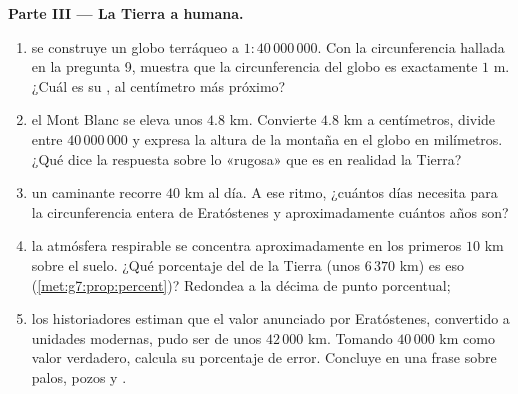 \begin{problem}
\medskip
\noindent\textbf{Parte III --- La Tierra a  humana.}
\begin{enumerate}[resume]
  \item se construye un globo terráqueo a  $1 : 40\,000\,000$. Con la
        circunferencia hallada en la pregunta 9, muestra que la
        circunferencia del globo es exactamente $1$ m. ¿Cuál es su
        , al centímetro más próximo?
  \item el Mont Blanc se eleva unos $4.8$ km. Convierte $4.8$ km a
        centímetros, divide entre $40\,000\,000$ y expresa la
        altura de la montaña en el globo en milímetros. ¿Qué dice
        la respuesta sobre lo «rugosa» que es en realidad la Tierra?
  \item un caminante recorre $40$ km al día. A ese ritmo, ¿cuántos
        días necesita para la circunferencia entera de Eratóstenes y
        aproximadamente cuántos años son?
  \item la atmósfera respirable se concentra aproximadamente en los
        primeros $10$ km sobre el suelo. ¿Qué porcentaje del
         de la Tierra (unos $6\,370$ km) es eso
        (\cref{met:g7:prop:percent})? Redondea a la décima
        de punto porcentual;
  \item los historiadores estiman que el valor anunciado por Eratóstenes,
        convertido a unidades modernas, pudo ser de unos
        $42\,000$ km. Tomando $40\,000$ km como valor verdadero,
        calcula su porcentaje de error. Concluye en una
        frase sobre palos, pozos y .
\end{enumerate}
\end{problem}
